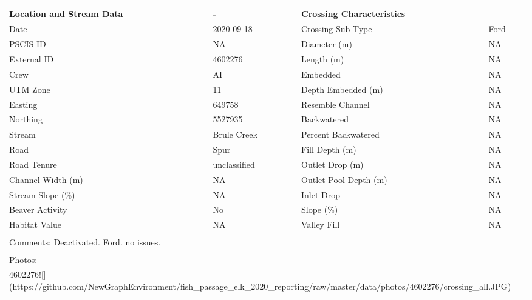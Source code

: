 \documentclass[
]{book}
\begin{document}
\begin{tabular}{l|l|l|l}
\hline
Location and Stream Data & - & Crossing Characteristics & --\\
\hline
Date & 2020-09-18 & Crossing Sub Type & Ford\\
\hline
PSCIS ID & NA & Diameter (m) & NA\\
\hline
External ID & 4602276 & Length (m) & NA\\
\hline
Crew & AI & Embedded & NA\\
\hline
UTM Zone & 11 & Depth Embedded (m) & NA\\
\hline
Easting & 649758 & Resemble Channel & NA\\
\hline
Northing & 5527935 & Backwatered & NA\\
\hline
Stream & Brule Creek & Percent Backwatered & NA\\
\hline
Road & Spur & Fill Depth (m) & NA\\
\hline
Road Tenure & unclassified & Outlet Drop (m) & NA\\
\hline
Channel Width (m) & NA & Outlet Pool Depth (m) & NA\\
\hline
Stream Slope (\%) & NA & Inlet Drop & NA\\
\hline
Beaver Activity & No & Slope (\%) & NA\\
\hline
Habitat Value & NA & Valley Fill & NA\\
\hline
\multicolumn{4}{l}{\textsuperscript{} Comments: Deactivated. Ford. no issues.}\\
\multicolumn{4}{l}{\textsuperscript{} Photos:}\\
\multicolumn{4}{l}{4602276![](https://github.com/NewGraphEnvironment/fish\_passage\_elk\_2020\_reporting/raw/master/data/photos/4602276/crossing\_all.JPG)}\\
\end{tabular}
\end{document}
